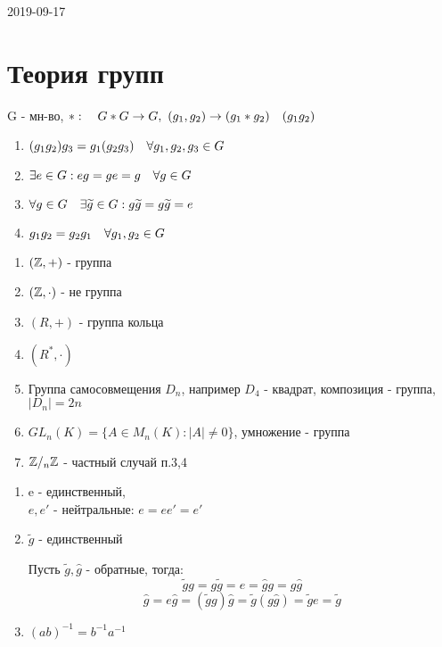 \documentclass[main]{subfiles}
\begin{document}
\begin{lect}{2019-09-17}
    \section{Теория групп}

    \begin{definition}[группа]
        G - мн-во, $*: \quad G*G \rightarrow G,\ (g_1, g_2) \rightarrow (g_1*g_2)\quad (g_1g_2)$
        \begin{enumerate}
        	\item $(g_1g_2)g_3 = g_1(g_2g_3) \quad \forall g_1, g_2, g_3 \in G$
        	\item $\exists e \in G : eg = ge = g \quad \forall g \in G$
        	\item $\forall g \in G \quad \exists \widetilde{g} \in G : g\widetilde{g} = g \widetilde{g} = e$
        	\item $g_1g_2 = g_2g_1 \quad \forall g_1, g_2 \in G$
    	\end{enumerate}
    \end{definition}

    \begin{examples}
        \begin{enumerate}
            \item $(\mathbb{Z},+)$ - группа
            \item $(\mathbb{Z}, \cdot)$ - не группа
            \item $(R, +)$ - группа кольца
            \item $(R^*, \cdot)$
            \item Группа самосовмещения $D_n$, например $D_4$ - квадрат, композиция - группа, $|D_n|=2n$
            \item $GL_n(K) = \{A \in M_n(K) : |A| \neq 0\}$, умножение - группа
            \item $\mathbb{Z}/_n \mathbb{Z}$ - частный случай п.3,4
        \end{enumerate}
    \end{examples}

    \begin{theorem}
        \begin{enumerate}
            \item e - единственный, \\
                $e,e'$ - нейтральные: $e=e e'=e'$
            \item $\widetilde{g}$ - единственный

            Пусть $\widetilde{g},\hat{g}$ - обратные, тогда:
            \[\widetilde{g}g = g\widetilde{g} = e = \hat{g}g = g\hat{g}\]
            \[\hat{g}=e \hat{g}=(\widetilde{g}g)\hat{g}=\widetilde{g}(g\hat{g})=\widetilde{g}e=\widetilde{g}\]
            \item $(a b)^{-1}=b^{-1}a^{-1}$


\end{enumerate}
\end{theorem}
\end{lect}
\end{document}
